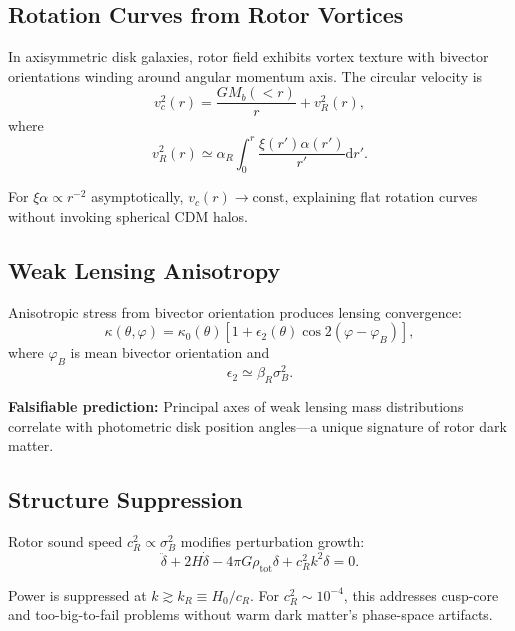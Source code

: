 \documentclass[11pt,a4paper]{article}
\numberwithin{equation}{section}
\theoremstyle{plain}
\theoremstyle{definition}
\theoremstyle{remark}
\newcommand{\dd}{\mathrm{d}}
\begin{document}
\subsection{Rotation Curves from Rotor Vortices}

In axisymmetric disk galaxies, rotor field exhibits vortex texture with bivector orientations winding around angular momentum axis. The circular velocity is
\begin{equation}
v_c^2(r) = \frac{GM_b(<r)}{r} + v_R^2(r),
\label{eq:rotation-curve}
\end{equation}
where
\begin{equation}
v_R^2(r) \simeq \alpha_R \int_0^r \frac{\xi(r')\alpha(r')}{r'}\dd r'.
\end{equation}

For $\xi\alpha \propto r^{-2}$ asymptotically, $v_c(r) \to \mathrm{const}$, explaining flat rotation curves without invoking spherical CDM halos.

\subsection{Weak Lensing Anisotropy}

Anisotropic stress from bivector orientation produces lensing convergence:
\begin{equation}
\kappa(\theta,\varphi) = \kappa_0(\theta)\left[1 + \epsilon_2(\theta)\cos 2(\varphi - \varphi_B)\right],
\label{eq:lensing-quadrupole}
\end{equation}
where $\varphi_B$ is mean bivector orientation and
\begin{equation}
\epsilon_2 \simeq \beta_R\sigma_B^2.
\end{equation}

\textbf{Falsifiable prediction:} Principal axes of weak lensing mass distributions correlate with photometric disk position angles—a unique signature of rotor dark matter.

\subsection{Structure Suppression}

Rotor sound speed $c_R^2 \propto \sigma_B^2$ modifies perturbation growth:
\begin{equation}
\ddot{\delta} + 2H\dot{\delta} - 4\pi G\rho_{\mathrm{tot}}\delta + c_R^2 k^2\delta = 0.
\end{equation}

Power is suppressed at $k \gtrsim k_R \equiv H_0/c_R$. For $c_R^2 \sim 10^{-4}$, this addresses cusp-core and too-big-to-fail problems without warm dark matter's phase-space artifacts.
\end{document}
